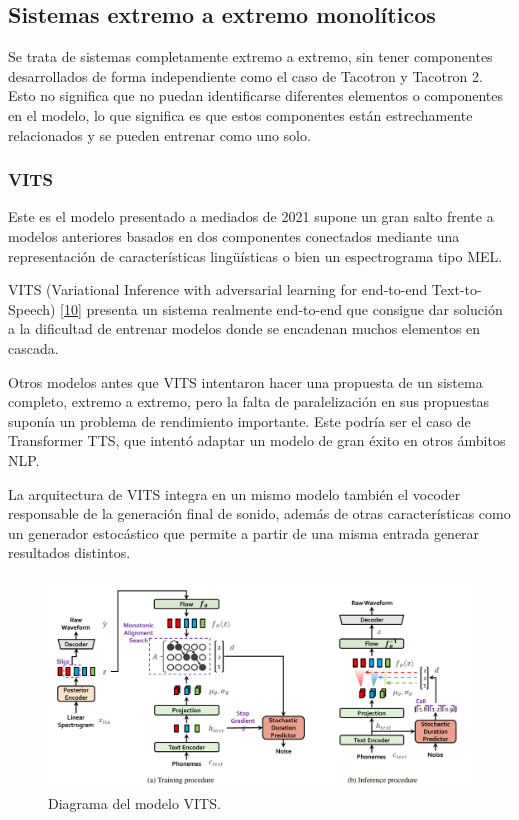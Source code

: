 \subsection{Sistemas extremo a extremo monolíticos}

Se trata de sistemas completamente extremo a extremo, sin tener componentes desarrollados de forma independiente como el caso de Tacotron y Tacotron 2. Esto no significa que no puedan identificarse diferentes elementos o componentes en el modelo, lo que significa es que estos componentes están estrechamente relacionados y se pueden entrenar como uno solo.

\subsubsection{VITS}

Este es el modelo presentado a mediados de 2021 supone un gran salto frente a modelos anteriores basados en dos componentes conectados mediante una representación de características lingüísticas o bien un espectrograma tipo MEL.

VITS (Variational Inference with adversarial learning for end-to-end Text-to-Speech)  \hyperref[EA_8]{[10]} presenta un sistema realmente end-to-end que consigue dar solución a la dificultad de entrenar modelos donde se encadenan muchos elementos en cascada. 

Otros modelos antes que VITS intentaron hacer una propuesta de un sistema completo, extremo a extremo, pero la falta de paralelización en sus propuestas suponía un problema de rendimiento importante. Este podría ser el caso de Transformer TTS, que intentó adaptar un modelo de gran éxito en otros ámbitos NLP.

La arquitectura de VITS integra en un mismo modelo también el vocoder responsable de la generación final de sonido, además de otras características como un generador estocástico que permite a partir de una misma entrada generar resultados distintos.


\begin{figure}[H]
\centering
\includegraphics[width=14cm]{4_estado_del_arte_img/vits_0.png}
\caption{Diagrama del modelo VITS.}
\label{fig:figure1}
\end{figure}


